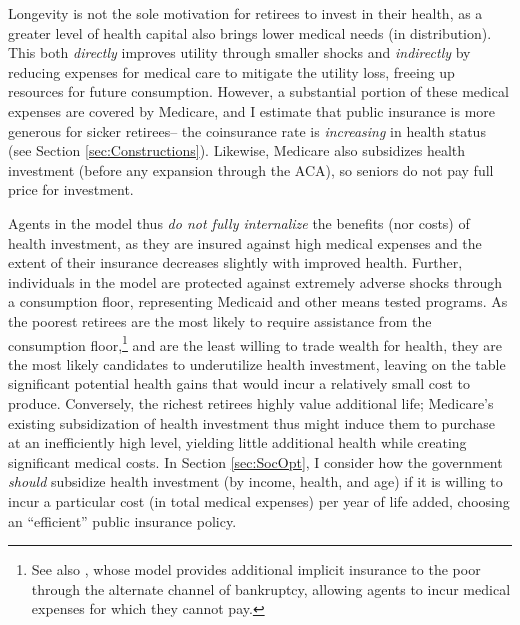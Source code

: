 \documentclass[12pt,pdftex,letterpaper]{article}
\begin{document}
Longevity is not the sole motivation for retirees to invest in their health, as a greater level of health capital also brings lower medical needs (in distribution).  This both \textit{directly} improves utility through smaller shocks and \textit{indirectly} by reducing expenses for medical care to mitigate the utility loss, freeing up resources for future consumption.  However, a substantial portion of these medical expenses are covered by Medicare, and I estimate that public insurance is more generous for sicker retirees-- the coinsurance rate is \textit{increasing} in health status (see Section \ref{sec:Constructions}).  Likewise, Medicare also subsidizes health investment (before any expansion through the ACA), so seniors do not pay full price for investment.

Agents in the model thus \textit{do not fully internalize} the benefits (nor costs) of health investment, as they are insured against high medical expenses and the extent of their insurance decreases slightly with improved health.  Further, individuals in the model are protected against extremely adverse shocks through a consumption floor, representing Medicaid and other means tested programs.  As the poorest retirees are the most likely to require assistance from the consumption floor,\footnote{See also \cite{ozkan14}, whose model provides additional implicit insurance to the poor through the alternate channel of bankruptcy, allowing agents to incur medical expenses for which they cannot pay.} and are the least willing to trade wealth for health, they are the most likely candidates to underutilize health investment, leaving on the table significant potential health gains that would incur a relatively small cost to produce.  Conversely, the richest retirees highly value additional life; Medicare's existing subsidization of health investment thus might induce them to purchase at an inefficiently high level, yielding little additional health while creating significant medical costs.  In Section \ref{sec:SocOpt}, I consider how the government \textit{should} subsidize health investment (by income, health, and age) if it is willing to incur a particular cost (in total medical expenses) per year of life added, choosing an ``efficient'' public insurance policy.
\end{document}
